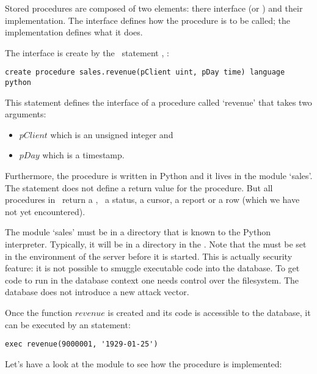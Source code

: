 Stored procedures are composed of two
elements: there interface (or )
and their implementation.
The interface defines how the procedure is
to be called; the implementation defines
what it does.

The interface is create by the \sql\ statement
, \eg:

\begin{sqlcode}
\begin{lstlisting}
create procedure sales.revenue(pClient uint, pDay time) language python
\end{lstlisting}
\end{sqlcode}

This statement defines the interface of a procedure
called `revenue' that takes two arguments:
\begin{itemize}
\item $pClient$ which is an unsigned integer and
\item $pDay$ which is a timestamp.
\end{itemize}
Furthermore, the procedure is written in Python and
it lives in the module `sales'.
The statement does not define a return value for the procedure.
But all procedures in \nowdb\ return a ,
\ie\ a status, a cursor, a report or a row (which we have not
yet encountered).

The module `sales' must be in a directory that is
known to the Python interpreter. Typically, it will
be in a directory in the .
Note that the  must be set
in the environment of the server before it is started.
This is actually security feature:
it is not possible to smuggle executable code
into the database. To get code to run in the database
context one needs control over the filesystem.
The database does not introduce a new attack vector.

Once the function $revenue$ is created
and its code is accessible to the database, it
can be executed by an  statement:
\begin{sqlcode}
\begin{lstlisting}
exec revenue(9000001, '1929-01-25')
\end{lstlisting}
\end{sqlcode}

Let's have a look at the module 
to see how the procedure is implemented:

